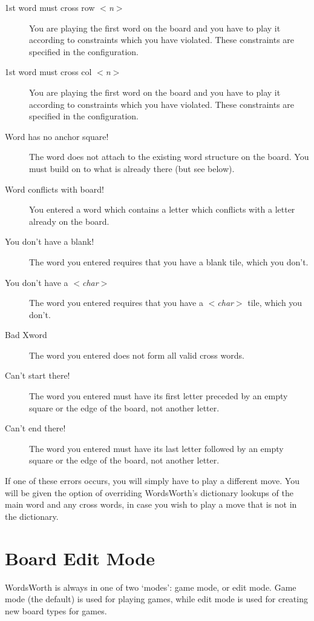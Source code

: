 \begin{description}
\item [1st word must cross row $<${\em n}$>$]
You are playing the first word on the board and you have to play
it according to constraints which you have violated. These constraints
are specified in the configuration.
\item [1st word must cross col $<${\em n}$>$]
You are playing the first word on the board and you have to play
it according to constraints which you have violated. These constraints
are specified in the configuration.
\item [Word has no anchor square!]
The word does not attach to the existing word structure on the
board. You must build on to what is already there (but see below).
\item [Word conflicts with board!]
You entered a word which contains a letter which conflicts with
a letter already on the board.
\item [You don't have a blank!]
The word you entered requires that you have a blank tile, which
you don't.
\item [You don't have a $<${\em char}$>$]
The word you entered requires that you have a $<${\em char}$>$
tile, which you don't.
\item [Bad Xword]
The word you entered does not form all valid cross words.
\item [Can't start there!]
The word you entered must have its first letter preceded by an
empty square or the edge of the board, not another letter.
\item [Can't end there!]
The word you entered must have its last letter followed by an
empty square or the edge of the board, not another letter.
\end{description}

If one of these errors occurs, you will simply have to play a
different move. You will be given the option of overriding
WordsWorth's dictionary lookups of the main word and any cross words,
in case you wish to play a move that is not in the dictionary.

\section{Board Edit Mode}

WordsWorth is always in one of two `modes': game mode, 
or edit mode. Game mode (the default) is used for playing games, 
while edit mode is used for creating new board types for games.

